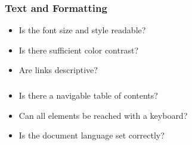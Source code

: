 \subsubsection{Text and Formatting}\label{ch15:sssec:checklist-text}
\begin{itemize}
	\item Is the font size and style readable?
	\item Is there sufficient color contrast?
	\item Are links descriptive?
\end{itemize}

\subsubsection{}\label{ch15:sssec:checklist-nav}
\begin{itemize}
	\item Is there a navigable table of contents?
	\item Can all elements be reached with a keyboard?
	\item Is the document language set correctly?
\end{itemize}

